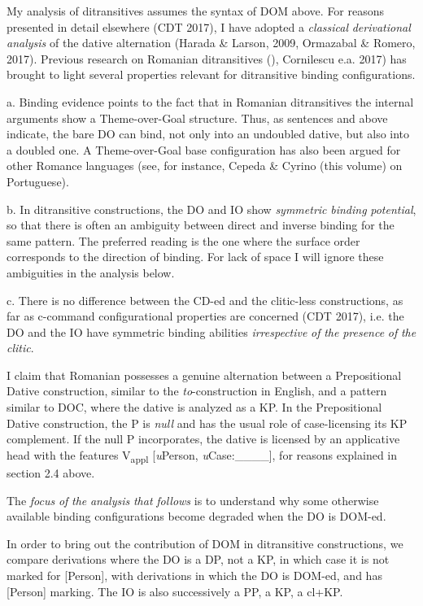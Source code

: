 \documentclass[output=paper,modfonts,nonflat]{langsci/langscibook}
\begin{document}
My analysis of ditransitives assumes the syntax of DOM above. For reasons presented in detail elsewhere (CDT 2017), I have adopted a \textit{classical} \textit{derivational} \textit{analysis} of the dative alternation (Harada \& Larson, 2009, Ormazabal \& Romero, 2017). Previous research on Romanian ditransitives (\citealt{DiaconescuRivero2007}), Cornilescu e.a. 2017) has brought to light several properties relevant for ditransitive binding configurations.

a. Binding evidence points to the fact that in Romanian ditransitives the internal arguments show a Theme-over-Goal structure. Thus, as sentences  and  above indicate, the bare DO can bind, not only into an undoubled dative, but also into a doubled one. A Theme-over-Goal base configuration has also been argued for other Romance languages (see, for instance, Cepeda \& Cyrino (this volume) on Portuguese).

b. In ditransitive constructions, the DO and IO show \textit{symmetric} \textit{binding} \textit{potential}, so that there is often an ambiguity between direct and inverse binding for the same pattern. The preferred reading is the one where the surface order corresponds to the direction of binding. For lack of space I will ignore these ambiguities in the analysis below.

c. There is no difference between the CD-ed and the clitic-less constructions, as far as c-command configurational properties are concerned (CDT 2017), i.e. the DO and the IO have symmetric binding abilities \textit{irrespective} \textit{of} \textit{the} \textit{presence} \textit{of} \textit{the} \textit{clitic}.

I claim that Romanian possesses a genuine alternation between a Prepositional Dative construction, similar to the \textit{to}{}-construction in English, and a pattern similar to DOC, where the dative is analyzed as a KP. In the Prepositional Dative construction, the P is \textit{null} and has the usual role of case-licensing its KP complement. If the null P incorporates, the dative is licensed by an applicative head with the features V\textsubscript{appl} [\textit{u}Person, \textit{u}Case:\_\_\_\_], for reasons explained in section 2.4 above.

The \textit{focus} \textit{of} \textit{the} \textit{analysis} \textit{that} \textit{follows} is to understand why some otherwise available binding configurations become degraded when the DO is DOM-ed.

In order to bring out the contribution of DOM in ditransitive constructions, we compare derivations where the DO is a DP, not a KP, in which case it is not marked for [Person], with derivations in which the DO is DOM-ed, and has [Person] marking. The IO is also successively a PP, a KP, a cl+KP.
\end{document}
